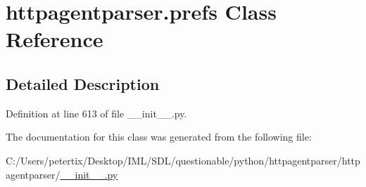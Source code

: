 \hypertarget{classhttpagentparser_1_1prefs}{}\section{httpagentparser.\+prefs Class Reference}
\label{classhttpagentparser_1_1prefs}


\subsection{Detailed Description}


Definition at line 613 of file \+\_\+\+\_\+init\+\_\+\+\_\+.\+py.



The documentation for this class was generated from the following file\+:\begin{DoxyCompactItemize}
\item 
C\+:/\+Users/petertix/\+Desktop/\+I\+M\+L/\+S\+D\+L/questionable/python/httpagentparser/httpagentparser/\hyperlink{____init_____8py}{\+\_\+\+\_\+init\+\_\+\+\_\+.\+py}\end{DoxyCompactItemize}

